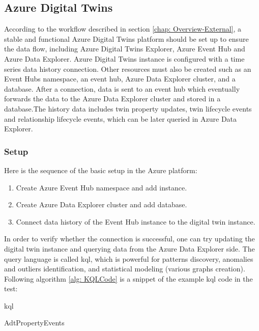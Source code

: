 \subsection{Azure Digital Twins}
According to the workflow described in section \ref{chap: Overview-External}, 
a stable and functional Azure Digital Twins platform should be set up to ensure
the data flow, including Azure Digital Twins Explorer, Azure Event Hub and Azure
Data Explorer. Azure Digital Twins instance is configured with a time series data 
history connection. Other resources must also be created such as an Event Hubs 
namespace, an event hub, Azure Data Explorer cluster, and a database. 
After a connection, data is sent to an event hub which eventually forwards 
the data to the Azure Data Explorer cluster and stored in a database.The history 
data includes twin property updates, twin lifecycle events and relationship lifecycle 
events, which can be later queried in Azure Data Explorer.
\subsubsection{Setup}
Here is the sequence of the basic setup in the Azure platform:
\begin{enumerate}
    \item Create Azure Event Hub namespace and add instance.
    \item Create Azure Data Explorer cluster and add database.
    \item Connect data history of the Event Hub instance to the digital twin instance.
\end{enumerate}

In order to verify whether the connection is successful, one can try updating the 
digital twin instance and querying data from the Azure Data Explorer side. The query
language is called \gls{kql}, which is powerful for patterns discovery, anomalies 
and outliers identification, and statistical modeling (various graphs creation). 
Following algorithm \ref{alg: KQLCode} is a snippet of the example \gls{kql} code in the test: 

\begin{algorithm}
    \caption{\gls{kql}}
    \label{alg: KQLCode}
    \begin{algorithmic}
        \State  AdtPropertyEvents 
    \end{algorithmic}
\end{algorithm}


